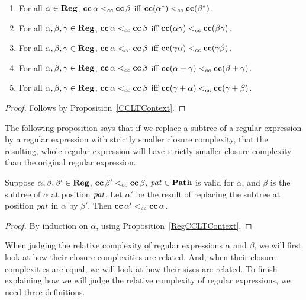 \begin{proposition}
\label{RegCCLTContext}
\begin{enumerate}[\quad(1)]
\item For all $\alpha\in\mathbf{Reg}$, $\mathbf{cc}\,\alpha\mathrel{<_{cc}}\mathbf{cc}\,\beta$
  iff $\mathbf{cc}(\alpha^*)\mathrel{<_{cc}}\mathbf{cc}(\beta^*)$.

\item For all $\alpha,\beta,\gamma\in\mathbf{Reg}$, $\mathbf{cc}\,\alpha\mathrel{<_{cc}}\mathbf{cc}\,\beta$
  iff $\mathbf{cc}(\alpha\gamma)\mathrel{<_{cc}}\mathbf{cc}(\beta\gamma)$.

\item For all $\alpha,\beta,\gamma\in\mathbf{Reg}$, $\mathbf{cc}\,\alpha\mathrel{<_{cc}}\mathbf{cc}\,\beta$
  iff $\mathbf{cc}(\gamma\alpha)\mathrel{<_{cc}}\mathbf{cc}(\gamma\beta)$.

\item For all $\alpha,\beta,\gamma\in\mathbf{Reg}$, $\mathbf{cc}\,\alpha\mathrel{<_{cc}}\mathbf{cc}\,\beta$
  iff $\mathbf{cc}(\alpha + \gamma)\mathrel{<_{cc}}\mathbf{cc}(\beta + \gamma)$.

\item For all $\alpha,\beta,\gamma\in\mathbf{Reg}$, $\mathbf{cc}\,\alpha\mathrel{<_{cc}}\mathbf{cc}\,\beta$
  iff $\mathbf{cc}(\gamma + \alpha)\mathrel{<_{cc}}\mathbf{cc}(\gamma + \beta)$.
\end{enumerate}
\end{proposition}

\begin{proof}
Follows by Proposition~\ref{CCLTContext}.
\end{proof}

The following proposition says that if we replace a subtree of a regular
expression by a regular expression with strictly smaller closure
complexity, that the resulting, whole regular expression
will have strictly smaller closure complexity than the original
regular expression.

\begin{proposition}
\label{RegCCLTSubstituteSubtree}

Suppose $\alpha,\beta,\beta'\in\mathbf{Reg}$, $\mathbf{cc}\,\beta'\mathrel{<_{cc}}\mathbf{cc}\,\beta$,
${\it pat}\in\mathbf{Path}$ is valid for $\alpha$, and $\beta$ is
the subtree of $\alpha$ at position ${\it pat}$.
Let $\alpha'$ be the result of replacing the subtree at
position ${\it pat}$ in $\alpha$ by $\beta'$. Then $\mathbf{cc}\,\alpha'\mathrel{<_{cc}}
\mathbf{cc}\,\alpha$.
\end{proposition}

\begin{proof}
By induction on $\alpha$, using Proposition~\ref{RegCCLTContext}.
\end{proof}

When judging the relative complexity of regular expressions $\alpha$
and $\beta$, we will first look at how their closure complexities are
related.  And, when their closure complexities are equal, we will
look at how their sizes are related.  To finish explaining how
we will judge the relative complexity of regular expressions, we
need three definitions.

